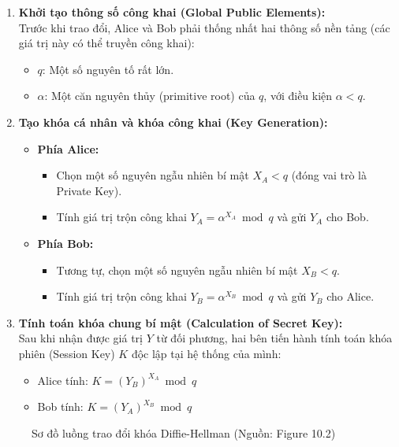 \begin{enumerate}
    \item \textbf{Khởi tạo thông số công khai (Global Public Elements):} \\
    Trước khi trao đổi, Alice và Bob phải thống nhất hai thông số nền tảng (các giá trị này có thể truyền công khai):
    \begin{itemize}
        \item $q$: Một số nguyên tố rất lớn.
        \item $\alpha$: Một căn nguyên thủy (primitive root) của $q$, với điều kiện $\alpha < q$.
    \end{itemize}

    \item \textbf{Tạo khóa cá nhân và khóa công khai (Key Generation):}
    \begin{itemize}
        \item \textbf{Phía Alice:}
        \begin{itemize}
            \item Chọn một số nguyên ngẫu nhiên bí mật $X_A < q$ (đóng vai trò là Private Key).
            \item Tính giá trị trộn công khai $Y_A = \alpha^{X_A} \bmod q$ và gửi $Y_A$ cho Bob.
        \end{itemize}
        \item \textbf{Phía Bob:}
        \begin{itemize}
            \item Tương tự, chọn một số nguyên ngẫu nhiên bí mật $X_B < q$.
            \item Tính giá trị trộn công khai $Y_B = \alpha^{X_B} \bmod q$ và gửi $Y_B$ cho Alice.
        \end{itemize}
    \end{itemize}

    \item \textbf{Tính toán khóa chung bí mật (Calculation of Secret Key):} \\
    Sau khi nhận được giá trị $Y$ từ đối phương, hai bên tiến hành tính toán khóa phiên (Session Key) $K$ độc lập tại hệ thống của mình:
    \begin{itemize}
        \item Alice tính: $K = (Y_B)^{X_A} \bmod q$
        \item Bob tính: $K = (Y_A)^{X_B} \bmod q$
    \end{itemize}
\end{enumerate}
\begin{figure}[htbp]
    \centering
    \caption{Sơ đồ luồng trao đổi khóa Diffie-Hellman (Nguồn: Figure 10.2)}
    \label{fig:dh_exchange}
\end{figure}


